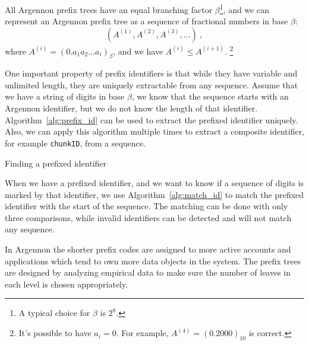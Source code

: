 All Argennon prefix trees have an equal branching
factor \(\beta\)\footnote{A typical choice for \(\beta\) is \(2^8\).}, and we can represent an Argennon
prefix tree as a sequence of fractional numbers in base \(\beta\):
\[
    (A^{(1)},A^{(2)},A^{(3)},\dots)\ ,
\]
where \(A^{(i)}=(0.a_{1}a_{2}\dots a_{i})_\beta\), and we have \(A^{(i)} \leq A^{(i+1)}\). \footnote{It's possible to
have \(a_i=0\). For example, \(A^{(4)}=(0.2000)_{10}\) is correct.}

One important property of prefix identifiers is that while they have variable and unlimited length, they are
uniquely extractable from any sequence. Assume that we have a string of digits in base $\beta$, we
know that the sequence starts with an Argennon identifier, but we do not know the length of that identifier.
Algorithm~\ref{alg:prefix_id} can be used to extract the prefixed identifier uniquely. Also, we can apply this algorithm
multiple times to extract a composite identifier, for example \texttt{chunkID}, from a sequence.

\begin{algorithm}[t]
    \DontPrintSemicolon
    \BlankLine
    \BlankLine
    {
        {
            \;
        }
    }
    \;
    \caption{Finding a prefixed identifier}\label{alg:prefix_id}
\end{algorithm}

When we have a prefixed identifier, and we want to know if a sequence of digits is marked by that identifier,
we use Algorithm~\ref{alg:match_id} to match the prefixed identifier with the start of the sequence. The matching
can be done with only three comparisons, while invalid identifiers can be detected and will not match
any sequence.

In Argennon the shorter prefix codes are assigned to more active accounts and applications which tend to own more
data objects in the system. The prefix trees are designed by analyzing empirical data to make sure the number
of leaves in each level is chosen appropriately.

